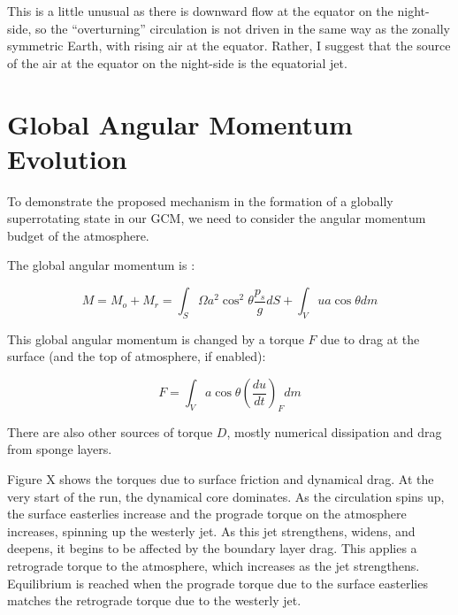 This is a little unusual as there is downward flow at the equator on the night-side, so the ``overturning'' circulation is not driven in the same way as the zonally symmetric Earth, with rising air at the equator. Rather, I suggest that the source of the air at the equator on the night-side is the equatorial jet.

\section{Global Angular Momentum Evolution}

To demonstrate the proposed mechanism in the formation of a globally superrotating state in our GCM, we need to consider the angular momentum budget of the atmosphere.

The global angular momentum is \citep{lebonnois2012momentum}:

\begin{equation}
  M = M _ { o } + M _ { r } = \int _ { S } \Omega a ^ { 2 } \cos ^ { 2 } \theta \frac { p _ { s } } { g } d S + \int _ { V } u a \cos \theta d m
\end{equation}

This global angular momentum is changed by a torque $F$ due to drag at the surface (and the top of atmosphere, if enabled):

\begin{equation}
  F = \int _ { V } a \cos \theta \left( \frac { d u } { d t } \right) _ { F } d m
\end{equation}

There are also other sources of torque $D$, mostly numerical dissipation and drag from sponge layers.


Figure X shows the torques due to surface friction and dynamical drag. At the very start of the run, the dynamical core dominates. As the circulation spins up, the surface easterlies increase and the prograde torque on the atmosphere increases, spinning up the westerly jet. As this jet strengthens, widens, and deepens, it begins to be affected by the boundary layer drag. This applies a retrograde torque to the atmosphere, which increases as the jet strengthens. Equilibrium is reached when the prograde torque due to the surface easterlies matches the retrograde torque due to the westerly jet.

